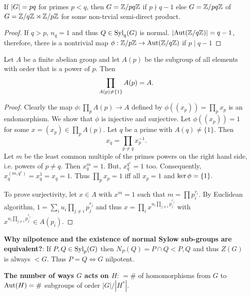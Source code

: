     \begin{theorem}
        If $|G|= pq$ for primes $p < q$, then $G = \mathbb{Z}/pq\mathbb{Z}$ if $p \nmid q - 1$ else $G = \mathbb{Z}/pq\mathbb{Z}$ of $G =  \mathbb{Z}/q\mathbb{Z} \rtimes \mathbb{Z}/p\mathbb{Z} $ for some non-trvial semi-direct product. 
    \end{theorem}

    \begin{proof}
        If $q > p$, $n_q = 1$ and thus $Q \in \text{Syl}_q(G)$ is normal. $|\text{Aut}(\mathbb{Z}/q\mathbb{Z})| = q - 1$, therefore, there is a nontrivial map $\phi: \mathbb{Z}/p\mathbb{Z}\to \text{Aut}(\mathbb{Z}/q\mathbb{Z})$ if $p \mid q - 1$  
    \end{proof}
    \begin{theorem}

        Let $A$ be a finite abelian group and let $A(p)$ be the subgroup of all elements with order that is a power of $p$. Then 
        $$\prod_{A(p) \neq \{1\}} A(p) = A.$$
    
    \end{theorem}

    \begin{proof}
        Clearly the map $\phi: \prod_p A(p) \to A$ defined by $\phi((x_p)) = \prod_p x_p $ is an endomorphism.  We show that $\phi$ is injective and surjective. Let $\phi((x_p)) = 1$ for some $x = (x_p) \in \prod_p A(p)$. Let $q$ be a prime with $A(q) \neq \{1\}$. Then 
        $$x_q = \prod_{ p \neq q} x_p^{-1}.$$
        Let $m$ be the least common multiple of the primes powers  on the right hand side, i.e. powers of $p \neq q$. Then $x^{m}_q = 1$. But, $x_q^{q^r} = 1$ too. Consequently, $x_q^{(m, q^r)} = x_q^{1} = x_q = 1$. Thus $\prod_p x_p = 1$ iff all $x_p = 1$ and $\ker \phi = \{1\}.$

        To prove surjectivity, let $x \in A$ with $x^m = 1$ such that $m = \prod p_i^{r_i}$. By Euclidean algorithm,  $1= \sum_i u_i\prod_{j\neq i} p_j^{r_j}$ and thus $x = \prod_i x^{u_i\prod_{j\neq i} p_j^{r_j}}$ with 
        $ x^{u_i \prod_{j\neq i} p_j^{r_j}} \in A(p_i).$
    \end{proof}
    
   
    \textbf{Why nilpotence and the existence of normal Sylow sub-groups are equivalent?}: If $P, Q \in \text{Syl}_p(G)$ then $N_P(Q) = P\cap Q < P, Q$ and thus $Z(G)$ is always $ < G$. Thus $P = Q \iff G$ nilpotent.  

    \textbf{The number of ways $G$ acts on $H$}: $= \#$ of homomorphisms from $G$ to $\text{Aut}(H) = \#$ subgroups of order $|G|/|H^*|.$ 